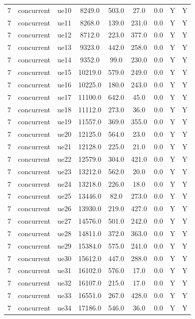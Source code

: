 \begin{table}[ht]
\begin{tabular}{|c|c|c|c|c|c|c|c|c|}
7 & concurrent & ue10 & 8249.0 & 503.0 & 27.0 & 0.0 & Y & Y \\
7 & concurrent & ue11 & 8268.0 & 139.0 & 231.0 & 0.0 & Y & Y \\
7 & concurrent & ue12 & 8712.0 & 223.0 & 377.0 & 0.0 & Y & Y \\
7 & concurrent & ue13 & 9323.0 & 442.0 & 258.0 & 0.0 & Y & Y \\
7 & concurrent & ue14 & 9352.0 & 99.0 & 230.0 & 0.0 & Y & Y \\
7 & concurrent & ue15 & 10219.0 & 579.0 & 249.0 & 0.0 & Y & Y \\
7 & concurrent & ue16 & 10225.0 & 180.0 & 243.0 & 0.0 & Y & Y \\
7 & concurrent & ue17 & 11100.0 & 642.0 & 45.0 & 0.0 & Y & Y \\
7 & concurrent & ue18 & 11112.0 & 273.0 & 36.0 & 0.0 & Y & Y \\
7 & concurrent & ue19 & 11557.0 & 369.0 & 355.0 & 0.0 & Y & Y \\
7 & concurrent & ue20 & 12125.0 & 564.0 & 23.0 & 0.0 & Y & Y \\
7 & concurrent & ue21 & 12128.0 & 225.0 & 21.0 & 0.0 & Y & Y \\
7 & concurrent & ue22 & 12579.0 & 304.0 & 421.0 & 0.0 & Y & Y \\
7 & concurrent & ue23 & 13212.0 & 562.0 & 20.0 & 0.0 & Y & Y \\
7 & concurrent & ue24 & 13218.0 & 226.0 & 18.0 & 0.0 & Y & Y \\
7 & concurrent & ue25 & 13446.0 & 82.0 & 273.0 & 0.0 & Y & Y \\
7 & concurrent & ue26 & 13930.0 & 219.0 & 427.0 & 0.0 & Y & Y \\
7 & concurrent & ue27 & 14576.0 & 501.0 & 242.0 & 0.0 & Y & Y \\
7 & concurrent & ue28 & 14811.0 & 372.0 & 363.0 & 0.0 & Y & Y \\
7 & concurrent & ue29 & 15384.0 & 575.0 & 241.0 & 0.0 & Y & Y \\
7 & concurrent & ue30 & 15612.0 & 447.0 & 288.0 & 0.0 & Y & Y \\
7 & concurrent & ue31 & 16102.0 & 576.0 & 17.0 & 0.0 & Y & Y \\
7 & concurrent & ue32 & 16107.0 & 215.0 & 17.0 & 0.0 & Y & Y \\
7 & concurrent & ue33 & 16551.0 & 267.0 & 428.0 & 0.0 & Y & Y \\
7 & concurrent & ue34 & 17186.0 & 546.0 & 36.0 & 0.0 & Y & Y \\

\end{tabular}
\end{table}
